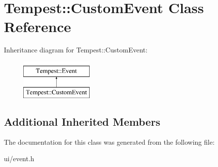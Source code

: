 \hypertarget{class_tempest_1_1_custom_event}{\section{Tempest\+:\+:Custom\+Event Class Reference}
\label{class_tempest_1_1_custom_event}
}
Inheritance diagram for Tempest\+:\+:Custom\+Event\+:\begin{figure}[H]
\begin{center}
\leavevmode
\includegraphics[height=2.000000cm]{class_tempest_1_1_custom_event}
\end{center}
\end{figure}
\subsection*{Additional Inherited Members}


The documentation for this class was generated from the following file\+:\begin{DoxyCompactItemize}
\item 
ui/event.\+h\end{DoxyCompactItemize}
